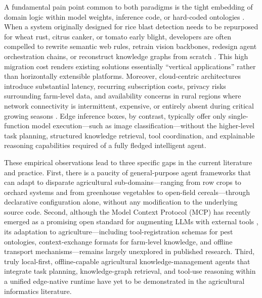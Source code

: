 \documentclass[11pt,a4paper]{article}
\begin{document}
A fundamental pain point common to both paradigms is the tight embedding of domain logic within model weights, inference code, or hard-coded ontologies \cite{alharbi2024agrodss}. When a system originally designed for rice blast detection needs to be repurposed for wheat rust, citrus canker, or tomato early blight, developers are often compelled to rewrite semantic web rules, retrain vision backbones, redesign agent orchestration chains, or reconstruct knowledge graphs from scratch \cite{agenticgraphrag2025}. This high migration cost renders existing solutions essentially ``vertical applications'' rather than horizontally extensible platforms. Moreover, cloud-centric architectures introduce substantial latency, recurring subscription costs, privacy risks surrounding farm-level data, and availability concerns in rural regions where network connectivity is intermittent, expensive, or entirely absent during critical growing seasons \cite{kleppmann2021localfirst}. Edge inference boxes, by contrast, typically offer only single-function model execution---such as image classification---without the higher-level task planning, structured knowledge retrieval, tool coordination, and explainable reasoning capabilities required of a fully fledged intelligent agent.

These empirical observations lead to three specific gaps in the current literature and practice. First, there is a paucity of general-purpose agent frameworks that can adapt to disparate agricultural sub-domains---ranging from row crops to orchard systems and from greenhouse vegetables to open-field cereals---through declarative configuration alone, without any modification to the underlying source code. Second, although the Model Context Protocol (MCP) has recently emerged as a promising open standard for augmenting LLMs with external tools \cite{anthropic2024mcp}, its adaptation to agriculture---including tool-registration schemas for pest ontologies, context-exchange formats for farm-level knowledge, and offline transport mechanisms---remains largely unexplored in published research. Third, truly local-first, offline-capable agricultural knowledge-management agents that integrate task planning, knowledge-graph retrieval, and tool-use reasoning within a unified edge-native runtime have yet to be demonstrated in the agricultural informatics literature.
\end{document}

